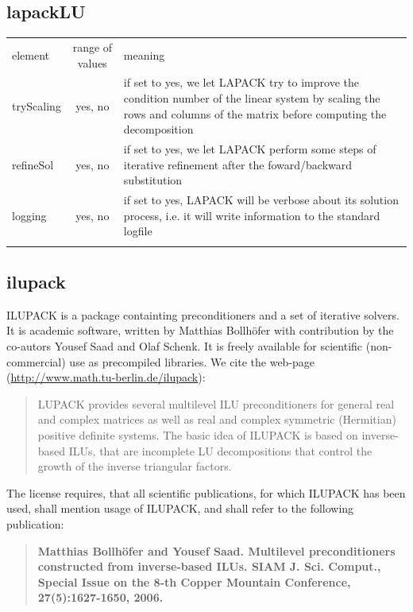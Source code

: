 \subsection{lapackLU}
%
%
\begin{center}
\begin{tabular}{lcp{}}
\hline\noalign{\smallskip}
element & range of values & meaning \\
\noalign{\smallskip}\hline\noalign{\smallskip}
tryScaling & yes, no & if set to yes, we let LAPACK try to improve the
                       condition number of the linear system by scaling the
                       rows and columns of the matrix before computing the
                       decomposition\\
refineSol  & yes, no & if set to yes, we let LAPACK perform some steps of
                       iterative refinement after the foward/backward
                       substitution\\
logging    & yes, no & if set to yes, LAPACK will be verbose about its solution
	               process, i.e. it will write information to the standard
	               logfile\\
\noalign{\smallskip}\hline
\end{tabular}
\end{center}
%
\subsection{ilupack}
\label{sec:ilupack}
ILUPACK is a package containting preconditioners and a set of iterative solvers. It is academic software, written by Matthias Bollh\"ofer with contribution by the co-autors Yousef Saad and Olaf Schenk. It is freely available for scientific (non-commercial) use as precompiled libraries. We cite the web-page
(\url{http://www.math.tu-berlin.de/ilupack}):
\begin{quote}
LUPACK provides several multilevel ILU preconditioners for general real and complex matrices as well as real and complex symmetric (Hermitian) positive definite systems.
The basic idea of ILUPACK is based on inverse-based ILUs, that are incomplete LU decompositions that control the growth of the inverse triangular factors. 
\end{quote}
The license requires, that all scientific publications, for which ILUPACK has been used, shall mention usage of ILUPACK, and shall refer to the following publication:

\begin{quote}
\textbf{Matthias Bollh\"ofer and Yousef Saad. Multilevel preconditioners constructed from inverse-based ILUs. SIAM J. Sci. Comput., Special Issue on the 8-th Copper Mountain Conference, 27(5):1627-1650, 2006.}
\end{quote}


